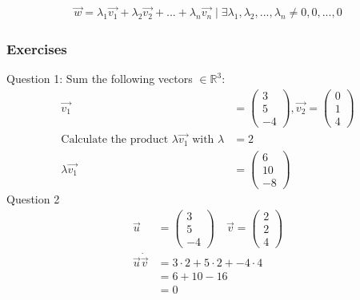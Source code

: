 \documentclass{article}
\begin{document}
\begin{align*}
    \vec{w} = \lambda_1 \vec{v_1} + \lambda_2 \vec{v_2} + ... + \lambda_n \vec{v_n} \mid \exists \lambda_1, \lambda_2, ..., \lambda_n \neq 0, 0, ..., 0
\end{align*}


\subsubsection*{Exercises}
Question 1:
Sum the following vectors $\in \mathbb{R}^3$:
\begin{align*}
    \vec{v_1}                                                                 & = \begin{pmatrix} 3 \\ 5 \\ -4 \end{pmatrix}, \vec{v_2} = \begin{pmatrix} 0 \\ 1 \\ 4 \end{pmatrix} \\
    \textrm{Calculate the product } \lambda \vec{v_1} \textrm{ with } \lambda & = 2                                                                                                 \\
    \lambda \vec{v_1}                                                         & = \begin{pmatrix} 6 \\ 10 \\ -8 \end{pmatrix}
\end{align*}
Question 2
\begin{align*}
    \vec{u}              & = \begin{pmatrix} 3 \\ 5 \\ -4 \end{pmatrix} \quad \vec{v} = \begin{pmatrix} 2 \\ 2 \\ 4 \end{pmatrix} \\
    \vec{u} \dot \vec{v} & = 3 \cdot 2 + 5 \cdot 2 + -4 \cdot 4                                                                   \\
                         & = 6 + 10 - 16                                                                                          \\
                         & = 0
\end{align*}
\end{document}
